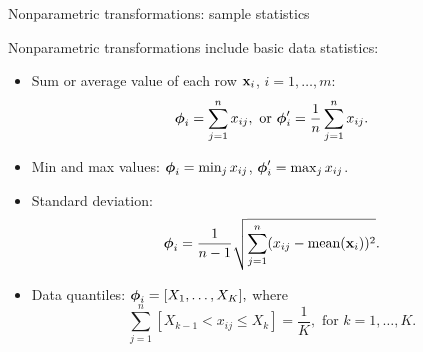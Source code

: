 \documentclass{beamer}
\begin{document}
\begin{frame}{Nonparametric transformations: sample statistics}

Nonparametric transformations include basic data statistics:
\begin{itemize}
\item Sum or average value of each row ${\mathbf{x}}_i$, $i = 1, \dots, m$:
\[ {\boldsymbol{\phi}}_i = \sum_{j = 1}^{n} x_{ij}, \text{~or~} {\boldsymbol{\phi}}'_i = \frac{1}{n}\sum_{j=1}^{n} x_{ij}. \]

\item Min and max values: $ {\boldsymbol{\phi}}_i = \min_{j} x_{ij}$, ${\boldsymbol{\phi}}'_i = \max_{j} x_{ij} $.
\item Standard deviation: \[{\boldsymbol{\phi}}_i = \frac{1}{n-1}\sqrt{\sum_{j=1}^{n}(x_{ij} - \text{mean}({\mathbf{x}}_i))^2}.\]
\item Data quantiles: $ {\boldsymbol{\phi}}_{i}  = [X_1, \dots, X_K], $
where \[\sum_{j=1}^{n} [X_{k-1} < x_{ij} \leq X_k ] = \frac{1}{K}, \text{~for~} k = 1,\dots, K. \]
\end{itemize}


\end{frame}
\end{document}
